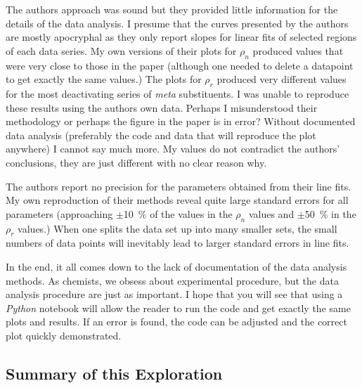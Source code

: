 \documentclass{tufte-handout}
\begin{document}
The authors approach was sound but they provided little information for the details of the data analysis. I presume that the curves presented by the authors are mostly apocryphal as they only report slopes for linear fits of selected regions of each data series. My own versions of their plots for $\rho_n$ produced values that were very close to those in the paper (although one needed to delete a datapoint to get exactly the same values.) The plots for $\rho_r$ produced very different values for the most deactivating series of \textit{meta} substituents. I was unable to reproduce these results using the authors own data. Perhaps I misunderstood their methodology or perhaps the figure in the paper is in error? Without documented data analysis (preferably the code and data that will reproduce the plot anywhere) I cannot say much more. My values do not contradict the authors' conclusions, they are just different with no clear reason why.

The authors report no precision for the parameters obtained from their line fits. My own reproduction of their methods reveal quite large standard errors for all parameters (approaching $\pm$\qty{10}{\percent} of the values in the $\rho_n$ values and $\pm$\qty{50}{\percent} in the $\rho_r$ values.) When one splits the data set up into many smaller sets, the small numbers of data points will inevitably lead to larger standard errors in line fits.

In the end, it all comes down to the lack of documentation of the data analysis methods. As chemists, we obsess about experimental procedure, but the data analysis procedure are just as important. I hope that you will see that using a \textit{Python} notebook will allow the reader to run the code and get exactly the same plots and results. If an error is found, the code can be adjusted and the correct plot quickly demonstrated. 

\subsection{Summary of this Exploration}
\end{document}

